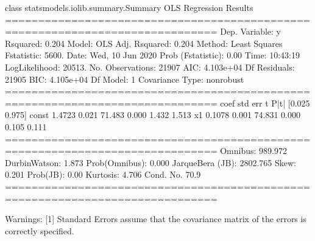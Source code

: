 \documentclass[letterpaper,10pt,english]{jupyterBook}
\begin{document}
\begin{sphinxVerbatim}[commandchars=\\\{\}]
\PYGZlt{}class \PYGZsq{}statsmodels.iolib.summary.Summary\PYGZsq{}\PYGZgt{}
\PYGZdq{}\PYGZdq{}\PYGZdq{}
                            OLS Regression Results                            
==============================================================================
Dep. Variable:                      y   R\PYGZhy{}squared:                       0.204
Model:                            OLS   Adj. R\PYGZhy{}squared:                  0.204
Method:                 Least Squares   F\PYGZhy{}statistic:                     5600.
Date:                Wed, 10 Jun 2020   Prob (F\PYGZhy{}statistic):               0.00
Time:                        10:43:19   Log\PYGZhy{}Likelihood:                \PYGZhy{}20513.
No. Observations:               21907   AIC:                         4.103e+04
Df Residuals:                   21905   BIC:                         4.105e+04
Df Model:                           1                                         
Covariance Type:            nonrobust                                         
==============================================================================
                 coef    std err          t      P\PYGZgt{}|t|      [0.025      0.975]
\PYGZhy{}\PYGZhy{}\PYGZhy{}\PYGZhy{}\PYGZhy{}\PYGZhy{}\PYGZhy{}\PYGZhy{}\PYGZhy{}\PYGZhy{}\PYGZhy{}\PYGZhy{}\PYGZhy{}\PYGZhy{}\PYGZhy{}\PYGZhy{}\PYGZhy{}\PYGZhy{}\PYGZhy{}\PYGZhy{}\PYGZhy{}\PYGZhy{}\PYGZhy{}\PYGZhy{}\PYGZhy{}\PYGZhy{}\PYGZhy{}\PYGZhy{}\PYGZhy{}\PYGZhy{}\PYGZhy{}\PYGZhy{}\PYGZhy{}\PYGZhy{}\PYGZhy{}\PYGZhy{}\PYGZhy{}\PYGZhy{}\PYGZhy{}\PYGZhy{}\PYGZhy{}\PYGZhy{}\PYGZhy{}\PYGZhy{}\PYGZhy{}\PYGZhy{}\PYGZhy{}\PYGZhy{}\PYGZhy{}\PYGZhy{}\PYGZhy{}\PYGZhy{}\PYGZhy{}\PYGZhy{}\PYGZhy{}\PYGZhy{}\PYGZhy{}\PYGZhy{}\PYGZhy{}\PYGZhy{}\PYGZhy{}\PYGZhy{}\PYGZhy{}\PYGZhy{}\PYGZhy{}\PYGZhy{}\PYGZhy{}\PYGZhy{}\PYGZhy{}\PYGZhy{}\PYGZhy{}\PYGZhy{}\PYGZhy{}\PYGZhy{}\PYGZhy{}\PYGZhy{}\PYGZhy{}\PYGZhy{}
const          1.4723      0.021     71.483      0.000       1.432       1.513
x1             0.1078      0.001     74.831      0.000       0.105       0.111
==============================================================================
Omnibus:                      989.972   Durbin\PYGZhy{}Watson:                   1.873
Prob(Omnibus):                  0.000   Jarque\PYGZhy{}Bera (JB):             2802.765
Skew:                           0.201   Prob(JB):                         0.00
Kurtosis:                       4.706   Cond. No.                         70.9
==============================================================================

Warnings:
[1] Standard Errors assume that the covariance matrix of the errors is correctly specified.
\PYGZdq{}\PYGZdq{}\PYGZdq{}
\end{sphinxVerbatim}
\end{document}
